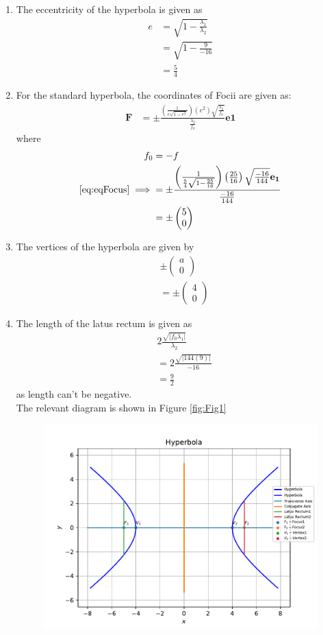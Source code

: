 \documentclass[12pt]{article}
\providecommand{\brak}[1]{\ensuremath{\left(#1\right)}}
\providecommand{\abs}[1]{\left\vert#1\right\vert}
\newcommand{\myvec}[1]{\ensuremath{\begin{pmatrix}#1\end{pmatrix}}}
\let\vec\mathbf
\begin{document}
\begin{enumerate}
\begin{enumerate}
\item The eccentricity of the hyperbola is given as  
\begin{align}
	e &= \sqrt{1-\frac{\lambda_1}{\lambda_2}} \\
	  &= \sqrt{1-\frac{9}{-16}} \\
          &= \frac{5}{4}
\end{align}
\item For the standard hyperbola, the coordinates of Focii are given as: 
\begin{align}
	\label{eq:eqFocus}
	\vec{F} &= \pm \frac{\brak{\frac{1}{e\sqrt{1-e^2}}}\brak{e^2}\sqrt{\frac{\lambda_2}{f_0}}}{\frac{\lambda_2}{f_0}}\vec{e1} 
\end{align}
where
\begin{align}
	f_0 &= -f \\
	\eqref{eq:eqFocus} \implies &=  \pm \frac{\brak{\frac{1}{\frac{5}{4}\sqrt{1-\frac{25}{16}}}}\brak{\frac{25}{16}}\sqrt{\frac{-16}{144}}\vec{e_1}}{\frac{-16}{144}} \\
	&= \pm \myvec{5 \\ 0}
\end{align}
\item The vertices of the hyperbola are given by 
\begin{align}
	& \pm\myvec{ a \\ 0} \\
	&= \pm\myvec{4 \\ 0}
\end{align}
\item The length of the latus rectum is given as 
\begin{align}
	\label{eq:eqLatRectLen}
	& 2\frac{\sqrt{\abs{f_0\lambda_1}}}{\lambda_2} \\
	&= 2\frac{\sqrt{\abs{144\brak{9}}}}{-16} \\
	&= \frac{9}{2}
\end{align}
as length can't be negative. \\
The relevant diagram is shown in Figure \ref{fig:Fig1}
\begin{figure}[!h]
	\begin{center}
		\includegraphics[width=\columnwidth]{./figs/problem1.pdf}

\end{center}
\end{figure}
\end{enumerate}
\end{enumerate}
\end{document}
